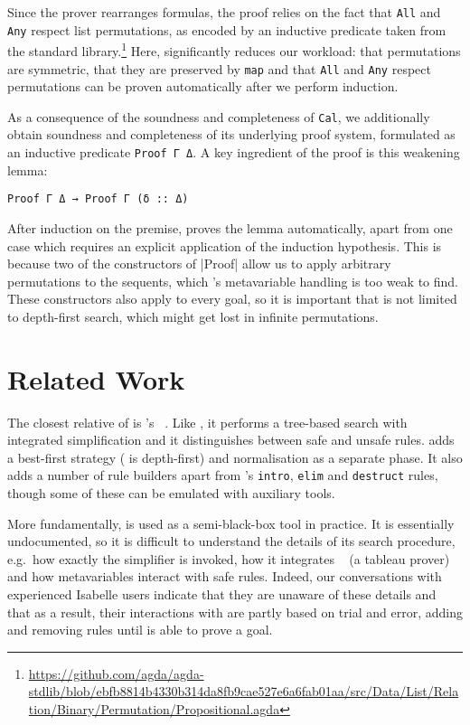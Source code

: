 Since the prover rearranges formulas, the proof relies on the fact that
\texttt{All} and \texttt{Any} respect list permutations, as encoded by an
inductive predicate taken from the \Agda{} standard
library.\footnote{\url{https://github.com/agda/agda-stdlib/blob/ebfb8814b4330b314da8fb9cae527e6a6fab01aa/src/Data/List/Relation/Binary/Permutation/Propositional.agda}}
Here, \Aesop{} significantly reduces our workload: that permutations are
symmetric, that they are preserved by \texttt{map} and that \texttt{All} and
\texttt{Any} respect permutations can be proven automatically after we perform
induction.

As a consequence of the soundness and completeness of \texttt{Cal}, we
additionally obtain soundness and completeness of its underlying proof system,
formulated as an inductive predicate \texttt{Proof~Γ~Δ}. A key ingredient of the
proof is this weakening lemma:
\begin{lstlisting}
Proof Γ Δ → Proof Γ (δ :: Δ)
\end{lstlisting}
After induction on the premise, \Aesop{} proves the lemma automatically, apart
from one case which requires an explicit application of the induction
hypothesis. This is because two of the constructors of |Proof| allow us to apply
arbitrary permutations to the sequents, which \Aesop's metavariable handling is
too weak to find. These constructors also apply to every goal, so it is
important that \Aesop{} is not limited to depth-first search, which might get
lost in infinite permutations.


\section{Related Work}%
\label{sec:related-work}

The closest relative of \Aesop{} is \Isabelle's
\auto{}~\cite{Isabelle,IsabelleAuto}. Like \Aesop, it performs a tree-based
search with integrated simplification and it distinguishes between safe and
unsafe rules. \Aesop{} adds a best-first strategy (\auto{} is depth-first) and
normalisation as a separate phase. It also adds a number of rule builders apart
from \auto's \texttt{intro}, \texttt{elim} and \texttt{destruct} rules, though
some of these can be emulated with auxiliary \Isabelle{} tools.

More fundamentally, \auto{} is used as a semi-black-box tool in practice. It is
essentially undocumented, so it is difficult to understand the details of its
search procedure, e.g.\ how exactly the simplifier is invoked, how it integrates
\blast~\cite{blast} (a tableau prover) and how metavariables interact with safe
rules. Indeed, our conversations with experienced Isabelle users indicate that
they are unaware of these details and that as a result, their interactions with
\auto{} are partly based on trial and error, adding and removing rules until
\auto{} is able to prove a goal.

